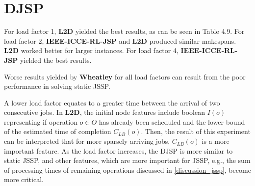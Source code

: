 \section{DJSP}
For load factor 1, \textbf{L2D} yielded the best results, as can be seen in Table 4.9. For load factor 2, \textbf{IEEE-ICCE-RL-JSP} and \textbf{L2D} produced similar makespans. \textbf{L2D} worked better for larger instances. For load factor 4, \textbf{IEEE-ICCE-RL-JSP} yielded the best results. 
\par
Worse results yielded by \textbf{Wheatley} for all load factors can result from the poor performance in solving static JSSP.
\par
A lower load factor equates to a greater time between the arrival of two consecutive jobs. In \textbf{L2D}, the initial node features include boolean $I(o)$ representing if operation $o \in O$ has already been scheduled and the lower bound of the estimated time of completion $C_{LB}(o)$. Then, the result of this experiment can be interpreted that for more sparsely arriving jobs, $C_{LB}(o)$ is a more important feature. As the load factor increases, the DJSP is more similar to static JSSP, and other features, which are more important for JSSP, e.g., the sum of processing times of remaining operations discussed in \ref{discussion_jssp}, become more critical.
